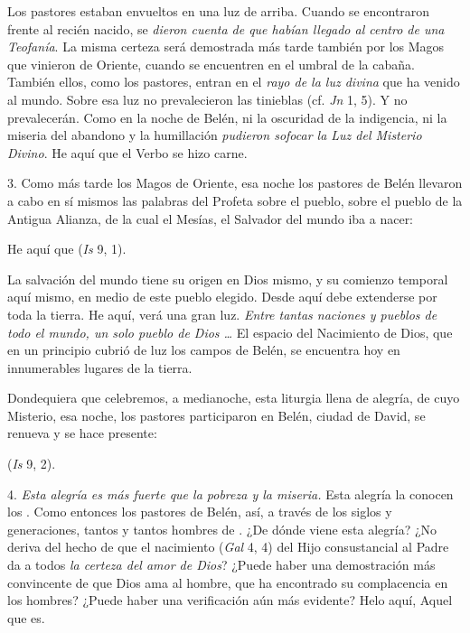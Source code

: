 \begin{body}
\begin{body}
		Los pastores estaban envueltos en una luz de arriba. Cuando se encontraron frente al recién nacido, se \emph{dieron cuenta de que habían llegado al centro de una Teofanía}. La misma certeza será demostrada más tarde también por los Magos que vinieron de Oriente, cuando se encuentren en el umbral de la cabaña. También ellos, como los pastores, entran en el \emph{rayo de la luz divina} que ha venido al mundo. Sobre esa luz no prevalecieron las tinieblas (cf. \emph{Jn} 1, 5). Y no prevalecerán. Como en la noche de Belén, ni la oscuridad de la indigencia, ni la miseria del abandono y la humillación \emph{pudieron sofocar la Luz del Misterio Divino}. He aquí que el Verbo se hizo carne.

		3. Como más tarde los Magos de Oriente, esa noche los pastores de Belén llevaron a cabo en sí mismos las palabras del Profeta sobre el pueblo, sobre el pueblo de la Antigua Alianza, de la cual el Mesías, el Salvador del mundo iba a nacer:

		He aquí que  (\emph{Is} 9, 1).

		La salvación del mundo tiene su origen en Dios mismo, y su comienzo temporal aquí mismo, en medio de este pueblo elegido. Desde aquí debe extenderse por toda la tierra. He aquí,  verá una gran luz. \emph{Entre tantas naciones y pueblos de todo el mundo, un solo pueblo de Dios \ldots{}} El espacio del Nacimiento de Dios, que en un principio cubrió de luz los campos de Belén, se encuentra hoy en innumerables lugares de la tierra.

		Dondequiera que celebremos, a medianoche, esta liturgia llena de alegría, de cuyo Misterio, esa noche, los pastores participaron en Belén, ciudad de David, se renueva y se hace presente:

		 (\emph{Is} 9, 2).

		4. \emph{Esta alegría es más fuerte que la pobreza y la miseria.} Esta alegría la conocen los . Como entonces los pastores de Belén, así, a través de los siglos y generaciones, tantos y tantos hombres de . ¿De dónde viene esta alegría? ¿No deriva del hecho de que el nacimiento  (\emph{Gal} 4, 4) del Hijo consustancial al Padre da a todos \emph{la certeza del amor de Dios}? ¿Puede haber una demostración más convincente de que Dios ama al hombre, que ha encontrado su complacencia en los hombres? ¿Puede haber una verificación aún más evidente? Helo aquí, Aquel que es.


\end{body}
\end{body}
